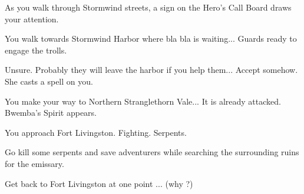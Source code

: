 As you walk through Stormwind streets, a sign on the Hero's Call Board draws your attention.


You walk towards Stormwind Harbor where bla bla is waiting... Guards ready to engage the trolls.





Unsure. Probably they will leave the harbor if you help them... Accept somehow. She casts a spell on you.



You make your way to Northern Stranglethorn Vale... It is already attacked. Bwemba's Spirit appears.


You approach Fort Livingston. Fighting. Serpents.




Go kill some serpents and save adventurers while searching the surrounding ruins for the emissary.




Get back to Fort Livingston at one point ... (why ?)

